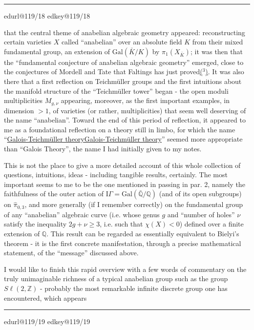 \documentclass[11pt,a4paper]{article}
\makeatletter
\newif\ifreading
\newif\ifenglish
\def\CurrentScanURL{}
\def\CurrentPageKey{}
\def\CurrentApparatus{}
\newcommand{\scanpage}[1]{%
  \clearpage
  \expandafter\let\expandafter\CurrentScanURL\csname edurl@#1\endcsname
  \expandafter\let\expandafter\CurrentPageKey\csname edkey@#1\endcsname
  \def\CurrentApparatus{}%
  \hypertarget{scan-\CurrentPageKey}{}%
  \typeout{EDITION-SCAN: \CurrentPageKey; PDFPAGE: \the\numexpr\ReadonlyShipoutCounter+1\relax}%
  \ifreading
    \marginnote{\raggedright\scriptsize\sffamily\href{\CurrentScanURL}{119 / \csname edpage@#1\endcsname}}%
  \else
    \noindent{\small\sffamily\href{\CurrentScanURL}{[scan #1]}}\par\smallskip
  \fi}
\newcommand{\mspage}[1]{%
  \ifreading\marginnote{\raggedright\scriptsize\sffamily p.\,#1}[2\baselineskip]%
  \else\noindent{\small\sffamily[p.\,#1]}\par\smallskip\fi}
\let\TextUline\uline
\renewcommand{\uline}[1]{\ifmmode\underline{#1}\else\TextUline{#1}\fi}
\newcommand{\margin}[1]{%
  \sbox{\MarginalTestBox}{\parbox{\marginparwidth}{\raggedright\footnotesize#1}}%
  \ifdim\dimexpr\ht\MarginalTestBox+\dp\MarginalTestBox\relax>3\baselineskip
    \par\smallskip\noindent\begin{minipage}{\linewidth}\hrule\smallskip
    {\footnotesize\textcolor{HandInk}{\ifenglish Marginal note:\else Note marginale :\fi\ #1}}\smallskip\hrule\end{minipage}\par\smallskip
  \else
    \marginnote{\raggedright\footnotesize\textcolor{HandInk}{#1}}%
  \fi}
\newcommand{\finishscan}{\ifx\CurrentApparatus\empty\else\par\bigskip\noindent\rule{.35\linewidth}{.35pt}\par\smallskip{\footnotesize\setlength{\parskip}{3pt}\CurrentApparatus}\fi}
\newcommand{\notecall}[3]{\hypertarget{#2}{\hyperlink{note-#1}{#3}}}
\makeatother
\begin{document}
\margin{17}

\finishscan
\scanpage{119/18}
\mspage{16}

that the central theme of anabelian algebraic geometry appeared:
reconstructing certain varieties $X$ called ``anabelian''
over an absolute field $K$ from their mixed fundamental group,
an extension of $\mathrm{Gal}(\bar{K}/K)$ by $\pi_1(X_{\bar{K}})$; it was then that the
``fundamental conjecture of anabelian algebraic geometry'' emerged,
close to the conjectures of Mordell and Tate that Faltings
has just proved\notecall{copy1-3}{call-esq_119_018-3-1}{($^3$)}. It was also there that a first reflection on
Teichmüller groups and the first intuitions about the manifold
structure of the ``Teichmüller tower'' began - the open moduli
multiplicities $M_{g,\nu}$ appearing, moreover, as the first important
examples, in dimension $> 1$, of varieties (or rather,
multiplicities) that seem well deserving of the name ``anabelian''.
Toward the end of this period of reflection, it appeared to me
as a foundational reflection on a theory still in
limbo, for which the name ``\uline{Galois-Teichmüller theory}''
seemed more appropriate than ``Galois Theory'', the name I had initially
given to my notes.

This is not the place to give a more detailed account
of this whole collection of questions, intuitions, ideas - including
tangible results, certainly. The most important seems to me to be the one
mentioned in passing in par. 2, namely the faithfulness of the outer
action of $\mathrm{I}\!\Gamma = \mathrm{Gal}(\bar{\mathbb{Q}}/\mathbb{Q})$ (and of its open subgroups) on $\hat{\pi}_{0,3}$,
and more generally (if I remember correctly) on the fundamental
group of any ``anabelian'' algebraic curve (i.e. whose genus
$g$ and ``number of holes'' $\nu$ satisfy the inequality $2g + \nu \geq 3$,
i.e. such that $\chi(X) < 0$) defined over a finite extension of $\mathbb{Q}$. This
result can be regarded as essentially equivalent to
Bielyi's theorem - it is the first concrete manifestation, through
a precise mathematical statement, of the ``message'' discussed
above.

I would like to finish this rapid overview with a few words
of commentary on the truly unimaginable richness of a typical
anabelian group such as the group $S\ell(2,\mathbb{Z})$ - probably the most
remarkable infinite discrete group one has encountered, which appears

\margin{18}

\finishscan
\scanpage{119/19}
\mspage{17}
\end{document}
